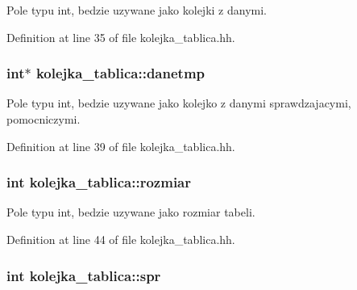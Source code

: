 Pole typu int, bedzie uzywane jako kolejki z danymi. 



Definition at line 35 of file kolejka\-\_\-tablica.\-hh.

\hypertarget{classkolejka__tablica_a3701ca21511ad3acdecf4cce08625eba}{
\subsubsection[{danetmp}]{\setlength{\rightskip}{0pt plus 5cm}int$\ast$ kolejka\-\_\-tablica\-::danetmp\hspace{0.3cm}{\ttfamily [private]}}}\label{classkolejka__tablica_a3701ca21511ad3acdecf4cce08625eba}


Pole typu int, bedzie uzywane jako kolejko z danymi sprawdzajacymi, pomocniczymi. 



Definition at line 39 of file kolejka\-\_\-tablica.\-hh.

\hypertarget{classkolejka__tablica_a1cec0ee294c7afb2c6b7ba5589cb8e38}{
\subsubsection[{rozmiar}]{\setlength{\rightskip}{0pt plus 5cm}int kolejka\-\_\-tablica\-::rozmiar\hspace{0.3cm}{\ttfamily [private]}}}\label{classkolejka__tablica_a1cec0ee294c7afb2c6b7ba5589cb8e38}


Pole typu int, bedzie uzywane jako rozmiar tabeli. 



Definition at line 44 of file kolejka\-\_\-tablica.\-hh.

\hypertarget{classkolejka__tablica_afbf8e02fb0cbdc2674fc68da04d8202d}{
\subsubsection[{spr}]{\setlength{\rightskip}{0pt plus 5cm}int kolejka\-\_\-tablica\-::spr\hspace{0.3cm}{\ttfamily [private]}}}\label{classkolejka__tablica_afbf8e02fb0cbdc2674fc68da04d8202d}


